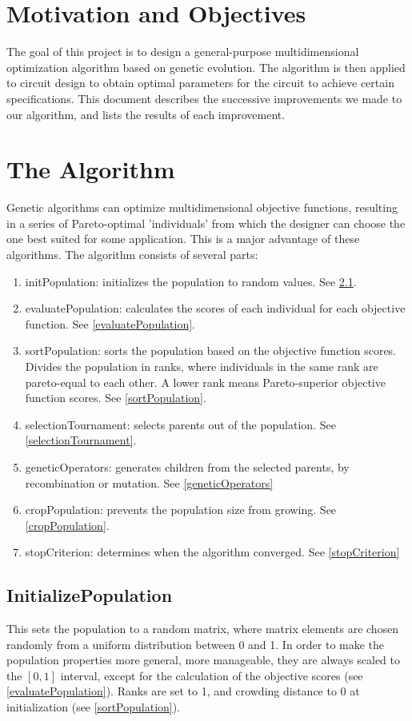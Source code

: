 \section{Motivation and Objectives}

The goal of this project is to design a general-purpose multidimensional optimization algorithm based on genetic evolution. The algorithm is then applied to circuit design to obtain optimal parameters for the circuit to achieve certain specifications. This document describes the successive improvements we made to our algorithm, and lists the results of each improvement.

\section{The Algorithm}
Genetic algorithms can optimize multidimensional objective functions, resulting in a series of Pareto-optimal 'individuals' from which the designer can choose the one best suited for some application. This is a major advantage of these algorithms.
The algorithm consists of several parts:
\begin{enumerate}
\item initPopulation: initializes the population to random values. See \cref{initPopulation}.
\item evaluatePopulation: calculates the scores of each individual for each objective function. See \cref{evaluatePopulation}.
\item sortPopulation: sorts the population based on the objective function scores. Divides the population in ranks, where individuals in the same rank are pareto-equal to each other. A lower rank means Pareto-superior objective function scores. See \cref{sortPopulation}.
\item selectionTournament: selects parents out of the population. See \cref{selectionTournament}.
\item geneticOperators: generates children from the selected parents, by recombination or mutation. See \cref{geneticOperators}
\item cropPopulation: prevents the population size from growing. See \cref{cropPopulation}.
\item stopCriterion: determines when the algorithm converged. See \cref{stopCriterion}
\end{enumerate}

\subsection{InitializePopulation} \label{initPopulation}
This sets the population to a random matrix, where matrix elements are chosen randomly from a uniform distribution between 0 and 1. In order to make the population properties more general, more manageable, they are always scaled to the $[0,1]$ interval, except for the calculation of the objective scores (see \ref{evaluatePopulation}).
Ranks are set to 1, and crowding distance to 0 at initialization (see \ref{sortPopulation}).

